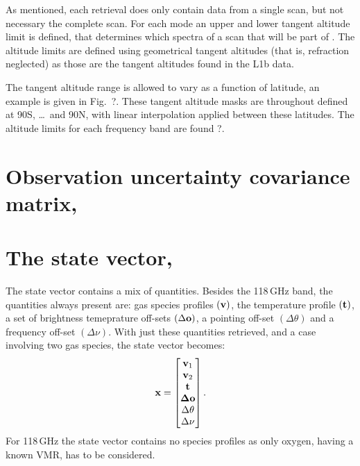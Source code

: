 As mentioned, each retrieval does only contain data from a single scan, but
not necessary the complete scan. For each mode an upper and lower tangent
altitude limit is defined, that determines which spectra of a scan that will be
part of \MsrVct. The altitude limits are defined using geometrical tangent
altitudes (that is, refraction neglected) as those are the tangent altitudes
found in the L1b data.

The tangent altitude range is allowed to vary as a function of latitude, an
example is given in Fig.~?. These tangent altitude masks are
throughout defined at 90\degree S, \dots{}\ and 90\degree N,
with linear interpolation applied between these latitudes. The altitude limits
for each frequency band are found ?.



\section{Observation uncertainty covariance matrix, }
\label{sec:So}
%


\section{The state vector, \SttVct}
\label{sec:x}
%
The state vector contains a mix of quantities. Besides the 118\,GHz band, the
quantities always present are: gas species profiles $(\mathbf{v})$, the
temperature profile $(\mathbf{t})$, a set of brightness temeprature off-sets
$(\Delta\mathbf{o})$, a pointing off-set $(\Delta\theta)$ and a frequency
off-set $(\Delta\nu)$. With just these quantities retrieved, and
a case involving two gas species, the state vector becomes:
\begin{equation}
  \label{eq:measvec}
  \mathbf{x} =
  \begin{bmatrix}
    \mathbf{v}_1\\ 
    \mathbf{v}_2\\ 
    \mathbf{t}\\ 
    \mathbf{\Delta\mathbf{o}}\\ 
    \Delta\theta\\ 
    \Delta\nu 
  \end{bmatrix}.
\end{equation}
For 118\,GHz the state vector contains no species profiles as only oxygen,
having a known VMR, has to be considered.

